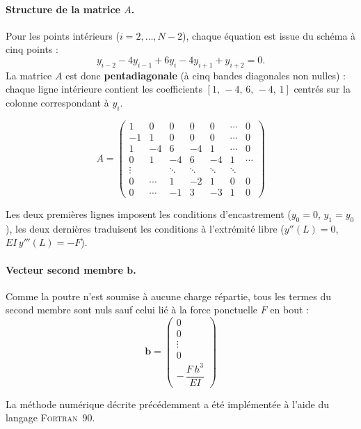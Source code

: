 \documentclass[12pt, a4paper]{article}
\begin{document}
\paragraph{Structure de la matrice $A$.}
Pour les points intérieurs ($i=2,\dots,N-2$), chaque équation est issue du schéma à cinq points :
\[
y_{i-2} - 4y_{i-1} + 6y_i - 4y_{i+1} + y_{i+2} = 0.
\]
La matrice $A$ est donc \textbf{pentadiagonale} (à cinq bandes diagonales non nulles) : chaque ligne intérieure contient les coefficients $[1,\,-4,\,6,\,-4,\,1]$ centrés sur la colonne correspondant à $y_i$.

\[
A =
\begin{pmatrix}
1 & 0 & 0 & 0 & 0 & \cdots & 0 \\[3pt]
-1 & 1 & 0 & 0 & 0 & \cdots & 0 \\[3pt]
1 & -4 & 6 & -4 & 1 & \cdots & 0 \\[3pt]
0 & 1 & -4 & 6 & -4 & 1 & \cdots \\[3pt]
\vdots & & \ddots & \ddots & \ddots & \ddots & \\[3pt]
0 & \cdots & 1 & -2 & 1 & 0 & 0 \\[3pt]
0 & \cdots & -1 & 3 & -3 & 1 & 0
\end{pmatrix}
\]


Les deux premières lignes imposent les conditions d’encastrement
($y_0=0$, $y_1=y_0$),  
les deux dernières traduisent les conditions à l’extrémité libre
($y''(L)=0$, $EI\,y'''(L)=-F$).

\paragraph{Vecteur second membre $\mathbf{b}$.}
Comme la poutre n’est soumise à aucune charge répartie, tous les termes du second membre sont nuls sauf celui lié à la force ponctuelle $F$ en bout :
\[
\mathbf{b} =
\begin{pmatrix}
0 \\ 0 \\ \vdots \\ 0 \\[2pt] -\,\dfrac{F\,h^3}{EI}
\end{pmatrix}
\]


La méthode numérique décrite précédemment a été implémentée à l’aide du langage \textsc{Fortran}~90.  
\\
\end{document}
